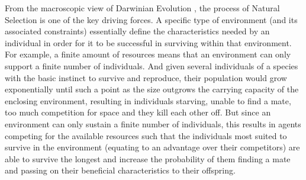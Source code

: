 From the macroscopic view of Darwinian Evolution \cite{EibenSmith2003}, the process of Natural Selection is one of the key driving forces. A specific type of environment (and its associated constraints) essentially define the characteristics needed by an individual in order for it to be successful in surviving within that environment. For example, a finite amount of resources means that an environment can only support a finite number of individuals. And given several individuals of a species with the basic instinct to survive and reproduce, their population would grow exponentially until such a point as the size outgrows the carrying capacity of the enclosing environment, resulting in individuals starving, unable to find a mate, too much competition for space and they kill each other off. But since an environment can only sustain a finite number of individuals, this results in agents competing for the available resources such that the individuals most suited to survive in the environment (equating to an advantage over their competitors) are able to survive the longest and increase the probability of them finding a mate and passing on their beneficial characteristics to their offspring.







